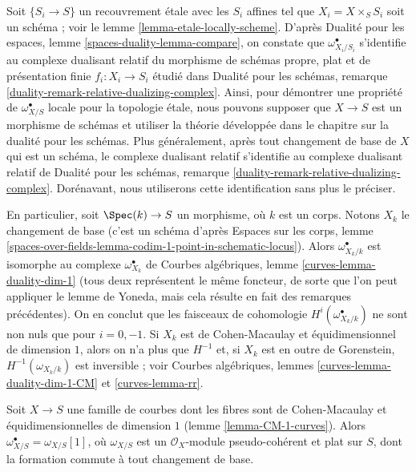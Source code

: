\medskip\noindent
Soit $\{S_i \to S\}$ un recouvrement étale avec les $S_i$ affines tel que
$X_i = X \times_S S_i$ soit un schéma ; voir le lemme \ref{lemma-etale-locally-scheme}.
D'après Dualité pour les espaces, lemme \ref{spaces-duality-lemma-compare},
on constate que $\omega_{X_i/S_i}^\bullet$ s'identifie
au complexe dualisant relatif du morphisme de schémas propre, plat et
de présentation finie $f_i : X_i \to S_i$ étudié dans
Dualité pour les schémas, remarque
\ref{duality-remark-relative-dualizing-complex}.
Ainsi, pour démontrer une propriété de $\omega_{X/S}^\bullet$
locale pour la topologie étale, nous pouvons supposer que $X \to S$ est un morphisme de schémas
et utiliser la théorie développée dans le chapitre sur la dualité pour les schémas.
Plus généralement, après tout changement de base de $X$ qui est un schéma,
le complexe dualisant relatif s'identifie au
complexe dualisant relatif de Dualité pour les schémas, remarque
\ref{duality-remark-relative-dualizing-complex}.
Dorénavant, nous utiliserons cette identification sans plus le préciser.

\medskip\noindent
En particulier, soit $\Spec(k) \to S$ un morphisme, où $k$ est un corps.
Notons $X_k$ le changement de base (c'est un schéma d'après
Espaces sur les corps, lemme
\ref{spaces-over-fields-lemma-codim-1-point-in-schematic-locus}).
Alors $\omega_{X_k/k}^\bullet$ est isomorphe
au complexe $\omega_{X_k}^\bullet$ de
Courbes algébriques, lemme \ref{curves-lemma-duality-dim-1}
(tous deux représentent le même foncteur, de sorte que l'on peut appliquer le lemme de Yoneda,
mais cela résulte en fait des remarques précédentes).
On en conclut que les faisceaux de cohomologie
$H^i(\omega_{X_k/k}^\bullet)$
ne sont non nuls que pour $i = 0, -1$.
Si $X_k$ est de Cohen-Macaulay et équidimensionnel de dimension $1$,
alors on n'a plus que $H^{-1}$ et, si $X_k$ est en outre de Gorenstein,
$H^{-1}(\omega_{X_k/k})$ est inversible ; voir
Courbes algébriques, lemmes \ref{curves-lemma-duality-dim-1-CM}
et \ref{curves-lemma-rr}.

\begin{lemma}
\label{lemma-CM-dualizing}
Soit $X \to S$ une famille de courbes dont les fibres sont de Cohen-Macaulay
et équidimensionnelles de dimension $1$ (lemme \ref{lemma-CM-1-curves}).
Alors $\omega_{X/S}^\bullet = \omega_{X/S}[1]$, où $\omega_{X/S}$
est un $\mathcal{O}_X$-module pseudo-cohérent et plat sur $S$, dont la
formation commute à tout changement de base.
\end{lemma}

